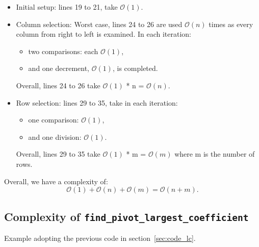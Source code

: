 \documentclass[a4paper]{article}
\numberwithin{equation}{section}
\begin{document}
\begin{itemize}
  \item Initial setup: lines 19 to 21, take $\mathcal{O}(1)$.
  \item Column selection: Worst case, lines 24 to 26 are used $\mathcal{O}(n)$ times as every column from right to left is examined. In each iteration:
  \begin{itemize}
    \item   two comparisons: each $\mathcal{O}(1)$,
    \item and one decrement, $\mathcal{O}(1)$, is completed.

  \end{itemize}
    Overall, lines 24 to 26 take $\mathcal{O}(1)$ * n =  $\mathcal{O}(n)$.
  \item Row selection: lines 29 to 35, take in each iteration:
\begin{itemize}
\item one comparison: $\mathcal{O}(1)$,
\item and one division: $\mathcal{O}(1)$.
\end{itemize}
    Overall, lines 29 to 35 take $\mathcal{O}(1)$ * m = $\mathcal{O}(m)$ where m is the number of rows.
\end{itemize}

  Overall, we have a complexity of:
\begin{equation}
    \label{eq:complexity_ls}
  \mathcal{O}(1) + \mathcal{O}(n) + \mathcal{O}(m) = \mathcal{O}(n + m).
\end{equation}


\subsection{Complexity of  \texttt{find\_pivot\_largest\_coefficient}}
\label{sec:complexity_lc}

Example adopting the previous code in section~\ref{sec:code_lc}.
\end{document}
